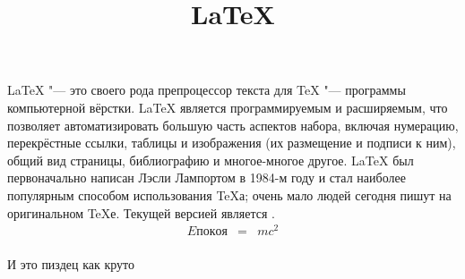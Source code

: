\documentclass[russian,utf8]{eskdtext}
\title{\LaTeX}
\date{}
\author{}
\begin{document}
  \maketitle
  \LaTeX{} "--- это своего рода препроцессор текста для \TeX{} "---
  программы компьютерной вёрстки. \LaTeX{} является программируемым и
  расширяемым, что позволяет автоматизировать большую часть аспектов
  набора, включая нумерацию, перекрёстные ссылки, таблицы и изображения
  (их размещение и подписи к ним), общий вид страницы, библиографию и
  многое-многое другое. \LaTeX{} был первоначально написан Лэсли Лампортом
  в 1984-м году и стал наиболее популярным способом использования \TeX{}а;
  очень мало людей сегодня пишут на оригинальном \TeX{}е. Текущей
  версией является \LaTeXe.
  \newline
  \begin{eqnarray}
    Eпокоя &=& mc^2\\
  \end{eqnarray}
  
  И это пиздец как круто
\end{document}
